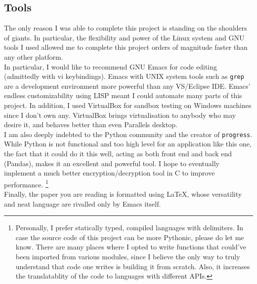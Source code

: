 \documentclass{article}
\begin{document}
\subsection{Tools}
The only reason I was able to complete this project is standing on the shoulders of giants. In
particular, the flexibility and power of the Linux system and GNU tools I used allowed me to
complete this project orders of magnitude faster than any other platform. \\
In particular, I would like to recommend GNU Emacs for code editing (admittedly with vi
keybindings). Emacs with UNIX system tools such as \texttt{grep} are a development environment more
powerful than any VS/Eclipse IDE. Emacs' endless customizability using LISP meant I could automate
many parts of this project. In addition, I used VirtualBox for sandbox testing on Windows
machines since I don't own any. VirtualBox brings virtualisation to anybody who may desire it, and
behaves better than even Parallels desktop.\\
I am also deeply indebted to the Python community and the creator of \texttt{progress}. While Python
is not functional and too high level for an application like this one, the fact that it could do it
this well, acting as both front end and back end (Pandas), makes it an excellent and powerful tool.
I hope to eventually implement a much better encryption/decryption tool in C to improve performance.
\footnote{Personally, I prefer statically typed, compiled languages with delimiters. In case the
source code of this project can be more Pythonic, please do let me know. There are many places where
I opted to write functions that could've been imported from various modules, since I believe the
only way to truly understand that code one writes is building it from scratch. Also, it increases
the translatablity of the code to languages with different APIs.} \\
Finally, the paper you are reading is formatted using \LaTeX, whose versatility and neat language
are rivalled only by Emacs itself.
\end{document}
